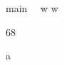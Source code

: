 \documentclass[12pt,a4paper]{book}
\begin{document}
%
\begin{eqcode}{main}{\ }{\ }{}
    w \in {} \lend
    w \gets \begin{tmatrix}
        68        \lend
    \end{tmatrix} \lend
    a \gets {} \lend
     \lend 
\end{eqcode}
\end{document}
